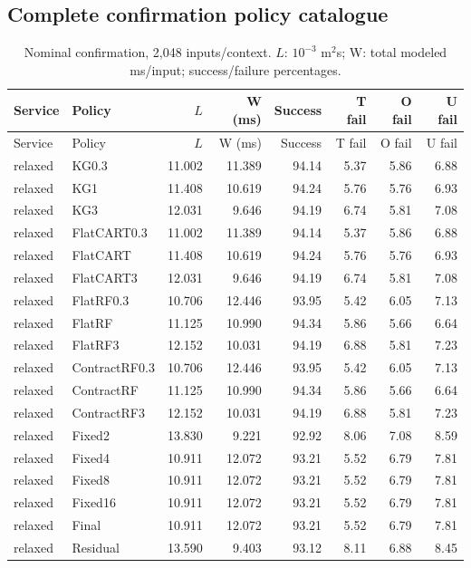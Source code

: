 \subsection{Complete confirmation policy catalogue}
\small\begin{longtable}{@{}llrrrrrr@{}}
\caption{Nominal confirmation, 2,048 inputs/context. $L$: $10^{-3}$ m$^2$s; W: total modeled ms/input; success/failure percentages.}\label{supp:confirmation-nominal}\\\toprule
Service & Policy & $L$ & W (ms) & Success & T fail & O fail & U fail\\\midrule\endfirsthead
\toprule
Service & Policy & $L$ & W (ms) & Success & T fail & O fail & U fail\\\midrule\endhead
relaxed & KG0.3 & 11.002 & 11.389 & 94.14 & 5.37 & 5.86 & 6.88\\
relaxed & KG1 & 11.408 & 10.619 & 94.24 & 5.76 & 5.76 & 6.93\\
relaxed & KG3 & 12.031 & 9.646 & 94.19 & 6.74 & 5.81 & 7.08\\
relaxed & FlatCART0.3 & 11.002 & 11.389 & 94.14 & 5.37 & 5.86 & 6.88\\
relaxed & FlatCART & 11.408 & 10.619 & 94.24 & 5.76 & 5.76 & 6.93\\
relaxed & FlatCART3 & 12.031 & 9.646 & 94.19 & 6.74 & 5.81 & 7.08\\
relaxed & FlatRF0.3 & 10.706 & 12.446 & 93.95 & 5.42 & 6.05 & 7.13\\
relaxed & FlatRF & 11.125 & 10.990 & 94.34 & 5.86 & 5.66 & 6.64\\
relaxed & FlatRF3 & 12.152 & 10.031 & 94.19 & 6.88 & 5.81 & 7.23\\
relaxed & ContractRF0.3 & 10.706 & 12.446 & 93.95 & 5.42 & 6.05 & 7.13\\
relaxed & ContractRF & 11.125 & 10.990 & 94.34 & 5.86 & 5.66 & 6.64\\
relaxed & ContractRF3 & 12.152 & 10.031 & 94.19 & 6.88 & 5.81 & 7.23\\
relaxed & Fixed2 & 13.830 & 9.221 & 92.92 & 8.06 & 7.08 & 8.59\\
relaxed & Fixed4 & 10.911 & 12.072 & 93.21 & 5.52 & 6.79 & 7.81\\
relaxed & Fixed8 & 10.911 & 12.072 & 93.21 & 5.52 & 6.79 & 7.81\\
relaxed & Fixed16 & 10.911 & 12.072 & 93.21 & 5.52 & 6.79 & 7.81\\
relaxed & Final & 10.911 & 12.072 & 93.21 & 5.52 & 6.79 & 7.81\\
relaxed & Residual & 13.590 & 9.403 & 93.12 & 8.11 & 6.88 & 8.45\\

\end{longtable}
